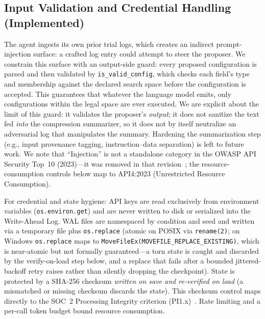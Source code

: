 \documentclass[conference]{IEEEtran}
\begin{document}
\subsection{Input Validation and Credential Handling (Implemented)}
The agent ingests its own prior trial logs, which creates an indirect prompt-injection surface: a crafted log entry could attempt to steer the proposer. We constrain this surface with an output-side guard: every proposed configuration is parsed and then validated by \texttt{is\_valid\_config}, which checks each field's type and membership against the declared search space before the configuration is accepted. This guarantees that whatever the language model emits, only configurations within the legal space are ever executed. We are explicit about the limit of this guard: it validates the proposer's \emph{output}; it does not sanitize the text fed \emph{into} the compression summarizer, so it does not by itself neutralize an adversarial log that manipulates the summary. Hardening the summarization step (e.g., input provenance tagging, instruction--data separation) is left to future work. We note that ``Injection'' is not a standalone category in the OWASP API Security Top~10 (2023)---it was removed in that revision~\citep{owasp2023api}; the resource-consumption controls below map to API4:2023 (Unrestricted Resource Consumption).

For credential and state hygiene: API keys are read exclusively from environment variables (\texttt{os.environ.get}) and are never written to disk or serialized into the Write-Ahead Log. WAL files are namespaced by condition and seed and written via a temporary file plus \texttt{os.replace} (atomic on POSIX via \texttt{rename(2)}; on Windows \texttt{os.replace} maps to \texttt{MoveFileEx(MOVEFILE\_REPLACE\_EXISTING)}, which is near-atomic but not formally guaranteed---a torn state is caught and discarded by the verify-on-load step below, and a replace that fails after a bounded jittered-backoff retry raises rather than silently dropping the checkpoint). State is protected by a SHA-256 checksum \emph{written on save and re-verified on load} (a mismatched or missing checksum discards the state). This checksum control maps directly to the SOC~2 Processing Integrity criterion (PI1.x)~\citep{aicpa2017tsc}. Rate limiting and a per-call token budget bound resource consumption.
\end{document}
